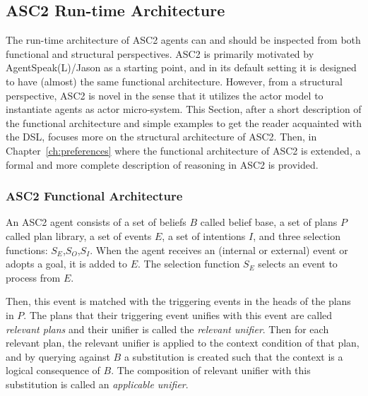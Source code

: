 \subsection{ASC2 Run-time Architecture}
\label{section_arch}
The run-time architecture of ASC2 agents can and should be inspected from both functional and structural perspectives. ASC2 is primarily motivated by AgentSpeak(L)/Jason as a starting point, and in its default setting it is designed to have (almost) the same functional architecture. However, from a structural perspective, ASC2 is novel in the sense that it utilizes the actor model to instantiate agents as actor micro-system. This Section, after a short description of the functional architecture and simple examples to get the reader acquainted with the DSL, focuses more on the structural architecture of ASC2. Then, in Chapter~\ref{ch:preferences} where the functional architecture of ASC2 is extended, a formal and more complete description of reasoning in ASC2 is provided.

\subsubsection{ASC2 Functional Architecture}
An ASC2 agent consists of a set of beliefs $B$ called belief base, a set of plans $P$ called plan library, a set of events $E$, a set of intentions $I$, and three selection functions: $S_E$,$S_O$,$S_I$. When the agent receives an (internal or external) event or adopts a goal, it is added to $E$. The selection function $S_E$ selects an event to process from $E$.


Then, this event is matched with the triggering events in the heads of the plans in $P$. The plans that their triggering event unifies with this event are called \textit{relevant plans} and their unifier is called the \textit{relevant unifier}. Then for each relevant plan, the relevant unifier is applied to the context condition of that plan, and by querying against $B$ a substitution is created such that the context is a logical consequence of $B$. The composition of relevant unifier with this substitution is called an \textit{applicable unifier}. 

